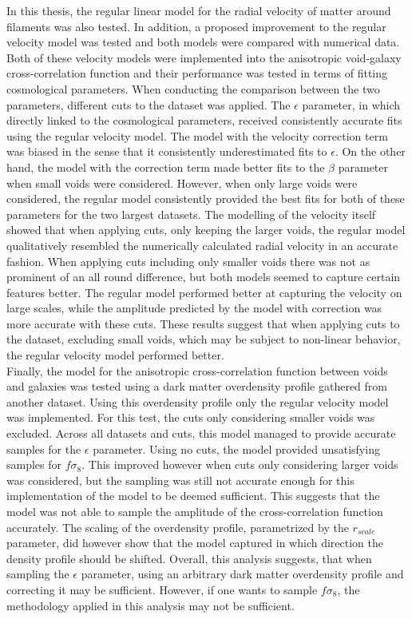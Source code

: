 In this thesis, the regular linear model for the radial velocity of matter around filaments was also tested. In addition, a proposed improvement to the regular velocity model was tested and both models were compared with numerical data. Both of these velocity models were implemented into the anisotropic void-galaxy cross-correlation function and their performance was tested in terms of fitting cosmological parameters. When conducting the comparison between the two parameters, different cuts to the dataset was applied. The $\epsilon$ parameter, in which directly linked to the cosmological parameters, received consistently accurate fits using the regular velocity model. The model with the velocity correction term was biased in the sense that it consistently underestimated fits to $\epsilon$. On the other hand, the model with the correction term made better fits to the $\beta$ parameter when small voids were considered. However, when only large voids were considered, the regular model consistently provided the best fits for both of these parameters for the two largest datasets. The modelling of the velocity itself showed that when applying cuts, only keeping the larger voids, the regular model qualitatively resembled the numerically calculated radial velocity in an accurate fashion. When applying cuts including only smaller voids there was not as prominent of an all round difference, but both models seemed to capture certain features better. The regular model performed better at capturing the velocity on large scales, while the amplitude predicted by the model with correction was more accurate with these cuts. These results suggest that when applying cuts to the dataset, excluding small voids, which may be subject to non-linear behavior, the regular velocity model performed better.\\\indent
Finally, the model for the anisotropic cross-correlation function between voids and galaxies was tested using a dark matter overdensity profile gathered from another dataset. Using this overdensity profile only the regular velocity model was implemented. For this test, the cuts only considering smaller voids was excluded. Across all datasets and cuts, this model managed to provide accurate samples for the $\epsilon$ parameter. Using no cuts, the model provided unsatisfying samples for $f\sigma_8$. This improved however when cuts only considering larger voids was considered, but the sampling was still not accurate enough for this implementation of the model to be deemed sufficient.  This suggests that the model was not able to sample the amplitude of the cross-correlation function accurately. The scaling of the overdensity profile, parametrized by the $r_{scale}$ parameter, did however show that the model captured in which direction the density profile should be shifted. Overall, this analysis suggests, that when sampling the $\epsilon$ parameter, using an arbitrary dark matter overdensity profile and correcting it may be sufficient. However, if one wants to sample $f\sigma_8$, the methodology applied in this analysis may not be sufficient.

